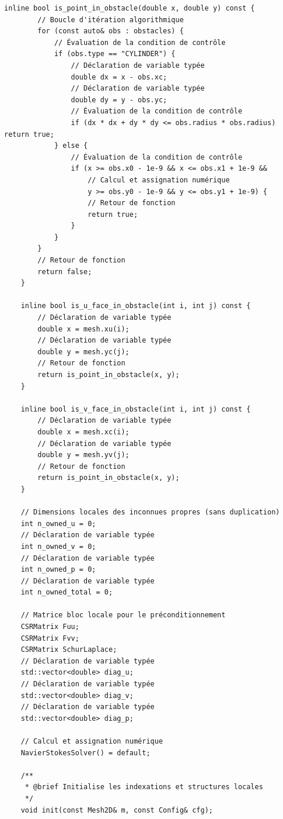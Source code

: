 \documentclass[10pt,a4paper,oneside]{book}
\begin{document}
\begin{lstlisting}[language={[11]C++}]
    inline bool is_point_in_obstacle(double x, double y) const {
        // Boucle d'itération algorithmique
        for (const auto& obs : obstacles) {
            // Évaluation de la condition de contrôle
            if (obs.type == "CYLINDER") {
                // Déclaration de variable typée
                double dx = x - obs.xc;
                // Déclaration de variable typée
                double dy = y - obs.yc;
                // Évaluation de la condition de contrôle
                if (dx * dx + dy * dy <= obs.radius * obs.radius) return true;
            } else {
                // Évaluation de la condition de contrôle
                if (x >= obs.x0 - 1e-9 && x <= obs.x1 + 1e-9 &&
                    // Calcul et assignation numérique
                    y >= obs.y0 - 1e-9 && y <= obs.y1 + 1e-9) {
                    // Retour de fonction
                    return true;
                }
            }
        }
        // Retour de fonction
        return false;
    }

    inline bool is_u_face_in_obstacle(int i, int j) const {
        // Déclaration de variable typée
        double x = mesh.xu(i);
        // Déclaration de variable typée
        double y = mesh.yc(j);
        // Retour de fonction
        return is_point_in_obstacle(x, y);
    }

    inline bool is_v_face_in_obstacle(int i, int j) const {
        // Déclaration de variable typée
        double x = mesh.xc(i);
        // Déclaration de variable typée
        double y = mesh.yv(j);
        // Retour de fonction
        return is_point_in_obstacle(x, y);
    }

    // Dimensions locales des inconnues propres (sans duplication)
    int n_owned_u = 0;
    // Déclaration de variable typée
    int n_owned_v = 0;
    // Déclaration de variable typée
    int n_owned_p = 0;
    // Déclaration de variable typée
    int n_owned_total = 0;

    // Matrice bloc locale pour le préconditionnement
    CSRMatrix Fuu;
    CSRMatrix Fvv;
    CSRMatrix SchurLaplace;
    // Déclaration de variable typée
    std::vector<double> diag_u;
    // Déclaration de variable typée
    std::vector<double> diag_v;
    // Déclaration de variable typée
    std::vector<double> diag_p;

    // Calcul et assignation numérique
    NavierStokesSolver() = default;

    /**
     * @brief Initialise les indexations et structures locales
     */
    void init(const Mesh2D& m, const Config& cfg);


\end{lstlisting}
\end{document}
